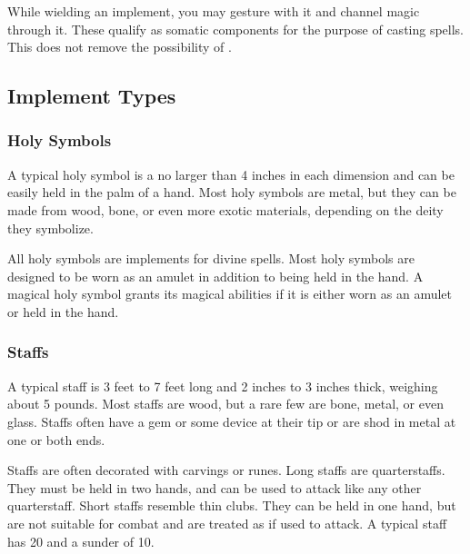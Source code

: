      While wielding an implement, you may gesture with it and channel magic through it.
    These qualify as somatic components for the purpose of casting spells.
    This does not remove the possibility of .

    \subsection{Implement Types}

        \subsubsection{Holy Symbols}

             A typical holy symbol is a no larger than 4 inches in each dimension and can be easily held in the palm of a hand.
            Most holy symbols are metal, but they can be made from wood, bone, or even more exotic materials, depending on the deity they symbolize.

             All holy symbols are implements for divine spells.
            Most holy symbols are designed to be worn as an amulet in addition to being held in the hand.
            A magical holy symbol grants its magical abilities if it is either worn as an amulet or held in the hand.

        \subsubsection{Staffs}

             A typical staff is 3 feet to 7 feet long and 2 inches to 3 inches thick, weighing about 5 pounds.
            Most staffs are wood, but a rare few are bone, metal, or even glass.
            Staffs often have a gem or some device at their tip or are shod in metal at one or both ends.

            Staffs are often decorated with carvings or runes.
            Long staffs are quarterstaffs.
            They must be held in two hands, and can be used to attack like any other quarterstaff.
            Short staffs resemble thin clubs.
            They can be held in one hand, but are not suitable for combat and are treated as  if used to attack.
            A typical staff has 20  and a sunder  of 10.

